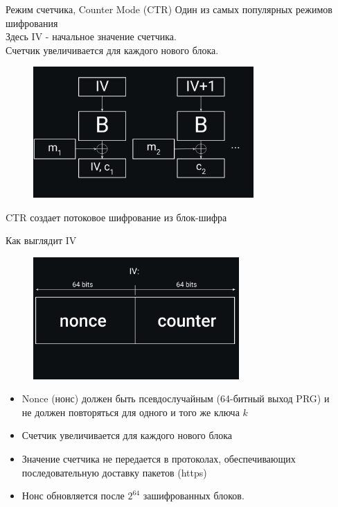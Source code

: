 \documentclass[usenames,dvipsnames,8pt,aspectratio=169]{beamer}
\begin{document}
\begin{frame}{Режим счетчика, Counter Mode (CTR)}
\Large
Один из самых популярных режимов шифрования \\
Здесь IV - начальное значение счетчика. \\
Счетчик увеличивается для каждого нового блока. \\
\begin{figure}
\includegraphics[width=0.75\textwidth]{CTR}
\end{figure}
\vspace{-20pt}
CTR создает потоковое шифрование из блок-шифра \\

\end{frame}

\begin{frame}{Как выглядит IV}
\begin{figure}
\includegraphics[width=0.70\textwidth]{ShapeOfIV}
\end{figure}
\vspace*{-50pt}
\large
\begin{itemize}
\item Nonce (нонс) должен быть псевдослучайным (64-битный выход PRG) и \\ не должен повторяться для одного и того же ключа $k$\\
\item Счетчик увеличивается для каждого нового блока
\item Значение счетчика не передается в протоколах, обеспечивающих \\ последовательную доставку пакетов (https)
\item Нонс обновляется после $2^{64}$ зашифрованных блоков.

\end{itemize}
\end{frame}
\end{document}
